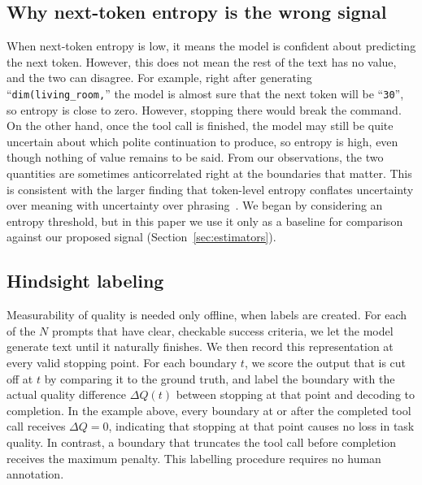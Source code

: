 \documentclass[review,12pt]{elsarticle}
\begin{document}
\subsection{Why next-token entropy is the wrong signal}
When next-token entropy is low, it means the model is confident about predicting the next token.
However, this does not mean the rest of the text has no value, and the two can
disagree. For example, right after generating ``\texttt{dim(living\_room,}'' the
model is almost sure that the next token will be ``\texttt{30}'', so entropy
is close to zero. However, stopping there would break the command.
On the other hand, once the tool call is finished, the model may still be quite
uncertain about which polite continuation to produce, so entropy is high,
even though nothing of value remains to be said. From our observations,
the two quantities are sometimes anticorrelated right at the boundaries that matter. This is consistent with the larger finding that token-level
entropy conflates uncertainty over meaning with uncertainty over
phrasing~\cite{farquhar2024semantic}.
We began by considering an entropy threshold, but in this paper we use it
only as a baseline for comparison against our proposed signal (Section~\ref{sec:estimators}).

\subsection{Hindsight labeling}
\label{sec:labeling}
Measurability of quality is needed only offline, when labels are created.
For each of the $N$ prompts that have clear, checkable success criteria, we let the model generate text until it naturally finishes. We then record this representation at every valid stopping point. For each boundary $t$, we score
the output that is cut off at $t$ by comparing it to the ground truth, and label the
boundary with the actual quality difference $\Delta Q(t)$ between
stopping at that point and decoding to completion. In the example above, every boundary at or after the completed tool call
receives $\Delta Q = 0$, indicating that stopping at that point causes no
loss in task quality. In contrast, a boundary that truncates the tool call
before completion receives the maximum penalty. This labelling procedure
requires no human annotation.
\end{document}
